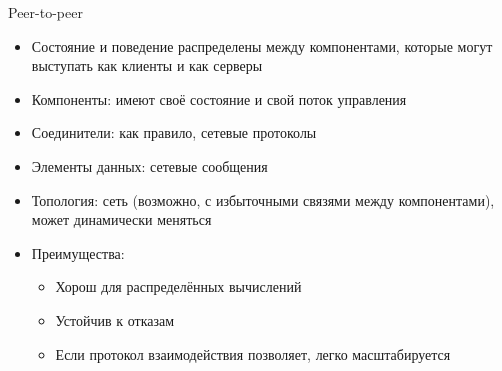 \documentclass{../../slides-style}
\begin{document}
    \begin{frame}{Peer-to-peer}
        \begin{itemize}
            \item Состояние и поведение распределены между компонентами, которые могут выступать как клиенты и как серверы
            \item Компоненты: имеют своё состояние и свой поток управления
            \item Соединители: как правило, сетевые протоколы
            \item Элементы данных: сетевые сообщения
            \item Топология: сеть (возможно, с избыточными связями между компонентами), может динамически меняться
            \item Преимущества:
            \begin{itemize}
                \item Хорош для распределённых вычислений
                \item Устойчив к отказам
                \item Если протокол взаимодействия позволяет, легко масштабируется
            \end{itemize}
        \end{itemize}
    \end{frame}
\end{document}
